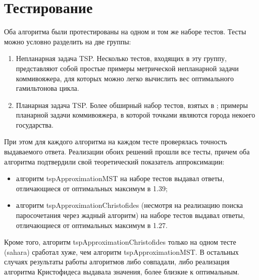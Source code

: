 \documentclass[a4paper]{article}
\begin{document}
\bigskip

\section{Тестирование}
Оба алгоритма были протестированы на одном и том же наборе тестов. Тесты можно условно разделить на две группы:
\begin{enumerate}
    \item Непланарная задача TSP. Несколько тестов, входящих в эту группу, представляют собой простые примеры метрической непланарной задачи коммивояжера, для которых можно легко вычислить вес оптимального гамильтонова цикла.
    \item Планарная задача TSP. Более обширный набор тестов, взятых в \cite{tests}; примеры планарной задачи коммивояжера, в которой точками являются города некоего государства.
\end{enumerate}

При этом для каждого алгоритма на каждом тесте проверялась точность выдаваемого ответа. Реализации обоих решений прошли все тесты, причем оба алгоритма подтвердили свой теоретический показатель аппроксимации:
\begin{itemize}
    \item алгоритм tspApproximationMST на наборе тестов выдавал ответы, отличающиеся от оптимальных максимум в 1.39;
    \item алгоритм tspApproximationChristofides (несмотря на реализацию поиска паросочетания через жадный алгоритм) на наборе тестов выдавал ответы, отличающиеся от оптимальных максимум в 1.27.
\end{itemize}
Кроме того, алгоритм tspApproximationChristofides только на одном тесте (sahara) сработал хуже, чем алгоритм tspApproximationMST. В остальных случаях результаты работы алгоритмов либо совпадали, либо реализация алгоритма Кристофидеса выдавала значения, более близкие к оптимальным.

\bigskip



\end{document}
